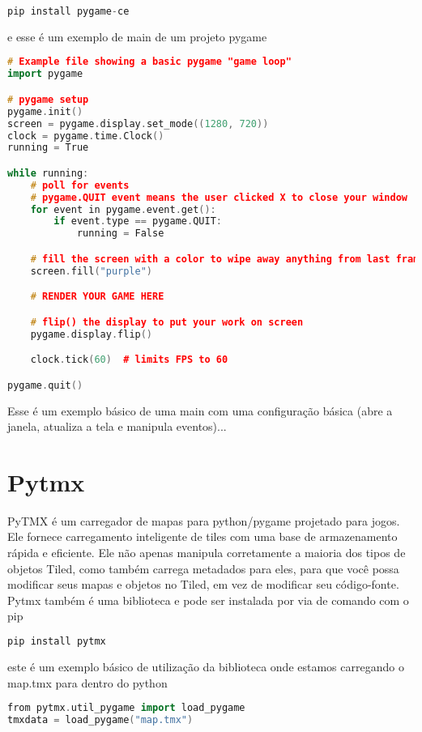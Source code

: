 \begin{lstlisting}[language=C++,breaklines, caption= Instalação Pytmx]
pip install pygame-ce
\end{lstlisting}
e esse é um exemplo de main de um projeto pygame
\begin{lstlisting}[language=C++,breaklines, caption= Exemplo de main de um projeto Pygame]
# Example file showing a basic pygame "game loop"
import pygame

# pygame setup
pygame.init()
screen = pygame.display.set_mode((1280, 720))
clock = pygame.time.Clock()
running = True

while running:
    # poll for events
    # pygame.QUIT event means the user clicked X to close your window
    for event in pygame.event.get():
        if event.type == pygame.QUIT:
            running = False

    # fill the screen with a color to wipe away anything from last frame
    screen.fill("purple")

    # RENDER YOUR GAME HERE

    # flip() the display to put your work on screen
    pygame.display.flip()

    clock.tick(60)  # limits FPS to 60

pygame.quit()
\end{lstlisting}

Esse é um exemplo básico de uma main  com uma configuração básica (abre a janela, atualiza a tela e manipula eventos)...

\section{Pytmx}
PyTMX é um carregador de mapas para python/pygame projetado para jogos. Ele fornece carregamento inteligente de tiles com uma base de armazenamento rápida e eficiente. Ele não apenas manipula corretamente a maioria dos tipos de objetos Tiled, como também carrega metadados para eles, para que você possa modificar seus mapas e objetos no Tiled, em vez de modificar seu código-fonte.\cite{PyTMX} 
Pytmx também é uma biblioteca e pode ser instalada por via de comando com o pip 
\begin{lstlisting}[language=C++,breaklines, caption= Instalacao Pytmx]
pip install pytmx
\end{lstlisting}

este é um exemplo básico de utilização da biblioteca onde estamos carregando o map.tmx para dentro do python
\begin{lstlisting}[language=C++,breaklines, caption= utilização básica Pytmx]
from pytmx.util_pygame import load_pygame
tmxdata = load_pygame("map.tmx")
\end{lstlisting}

